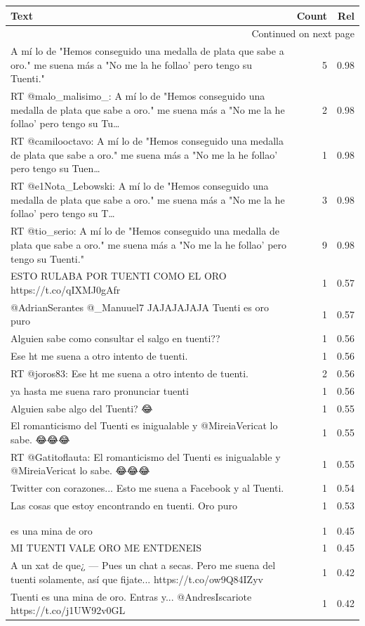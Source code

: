 \begin{longtable}{p{12.5cm}rr}
\toprule
Text & Count & Rel \\
\midrule
\endhead
\midrule
\multicolumn{3}{r}{{Continued on next page}} \\
\midrule
\endfoot

\bottomrule
\endlastfoot
A mí lo de "Hemos conseguido una medalla de plata que sabe a oro." me suena más a "No me la he follao' pero tengo su Tuenti." & 5 & 0.98 \\
RT @malo\_malisimo\_: A mí lo de "Hemos conseguido una medalla de plata que sabe a oro." me suena más a "No me la he follao' pero tengo su Tu… & 2 & 0.98 \\
RT @camilooctavo: A mí lo de "Hemos conseguido una medalla de plata que sabe a oro." me suena más a "No me la he follao' pero tengo su Tuen… & 1 & 0.98 \\
RT @e1Nota\_Lebowski: A mí lo de "Hemos conseguido una medalla de plata que sabe a oro." me suena más a "No me la he follao' pero tengo su T… & 3 & 0.98 \\
RT @tio\_serio: A mí lo de "Hemos conseguido una medalla de plata que sabe a oro." me suena más a "No me la he follao' pero tengo su Tuenti." & 9 & 0.98 \\
ESTO RULABA POR TUENTI COMO EL ORO https://t.co/qIXMJ0gAfr & 1 & 0.57 \\
@AdrianSerantes @\_Manuuel7 JAJAJAJAJA Tuenti es oro puro & 1 & 0.57 \\
Alguien sabe como consultar el salgo en tuenti?? & 1 & 0.56 \\
Ese ht me suena a otro intento de tuenti. & 1 & 0.56 \\
RT @joros83: Ese ht me suena a otro intento de tuenti. & 2 & 0.56 \\
ya hasta me suena raro pronunciar tuenti & 1 & 0.56 \\
Alguien sabe algo del Tuenti? 😂 & 1 & 0.55 \\
El romanticismo del Tuenti es inigualable y @MireiaVericat lo sabe. 😂😂😂 & 1 & 0.55 \\
RT @Gatitoflauta: El romanticismo del Tuenti es inigualable y @MireiaVericat lo sabe. 😂😂😂 & 1 & 0.55 \\
Twitter con corazones... Esto me suena a Facebook y al Tuenti. & 1 & 0.54 \\
Las cosas que estoy encontrando en tuenti. Oro puro & 1 & 0.53 \\
\begin{tabular}[c]{@{}l@{}}me he decidido meter a tuenti y al hacerlo he comprendido que eso ya no es tuenti \\  \\ es una mina de oro\end{tabular} & 1 & 0.45 \\
MI TUENTI VALE ORO ME ENTDENEIS & 1 & 0.45 \\
A un xat de que¿ — Pues un chat a secas. Pero me suena del tuenti solamente, así que fijate... https://t.co/ow9Q84IZyv & 1 & 0.42 \\
Tuenti es una mina de oro. Entras y...  @AndresIscariote https://t.co/j1UW92v0GL & 1 & 0.42 \\

\end{longtable}
